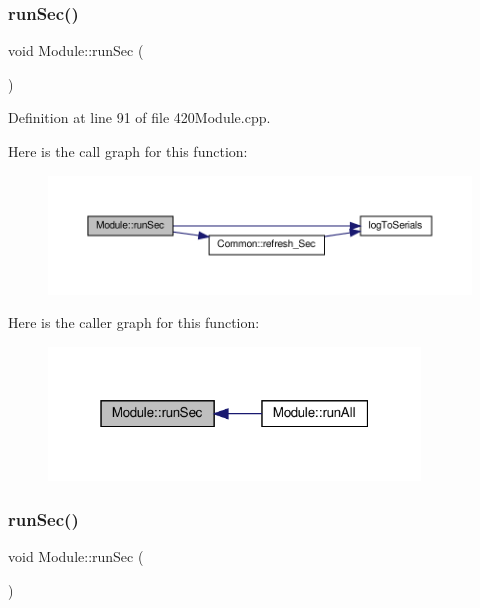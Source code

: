 \subsubsection{\texorpdfstring{run\+Sec()}{runSec()}\hspace{0.1cm}{\footnotesize\ttfamily [1/2]}}
{\footnotesize\ttfamily void Module\+::run\+Sec (\begin{DoxyParamCaption}{ }\end{DoxyParamCaption})}



Definition at line 91 of file 420\+Module.\+cpp.

Here is the call graph for this function\+:
\nopagebreak
\begin{figure}[H]
\begin{center}
\leavevmode
\includegraphics[width=350pt]{class_module_ace01fc8566dc1d6367560d1ac61c2c18_cgraph}
\end{center}
\end{figure}
Here is the caller graph for this function\+:
\nopagebreak
\begin{figure}[H]
\begin{center}
\leavevmode
\includegraphics[width=280pt]{class_module_ace01fc8566dc1d6367560d1ac61c2c18_icgraph}
\end{center}
\end{figure}
\mbox{\label{class_module_ace01fc8566dc1d6367560d1ac61c2c18}} 
\subsubsection{\texorpdfstring{run\+Sec()}{runSec()}\hspace{0.1cm}{\footnotesize\ttfamily [2/2]}}
{\footnotesize\ttfamily void Module\+::run\+Sec (\begin{DoxyParamCaption}{ }\end{DoxyParamCaption})}



